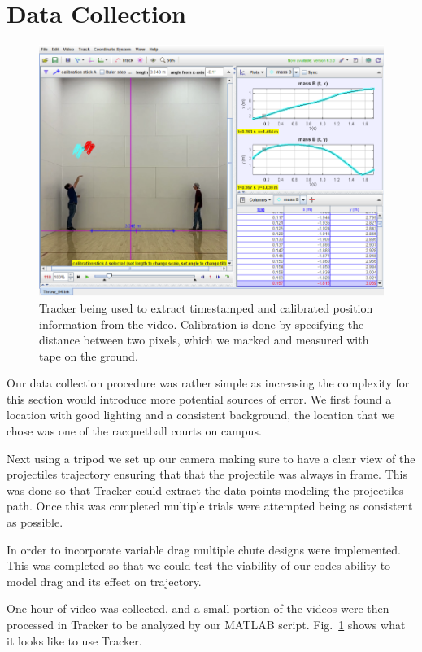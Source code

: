\section{Data Collection}

\begin{figure}[t]
\centering
\includegraphics[width=.9\linewidth]{images/TrackerScreenshot.png}
\caption{\label{fig:TrackerScreenshot} Tracker being used to extract timestamped and calibrated position information from the video. Calibration is done by specifying the distance between two pixels, which we marked and measured with tape on the ground.}
\end{figure}

	Our data collection procedure was rather simple as increasing the complexity for this section would introduce more potential sources of error. We first found a location with good lighting and a consistent background, the location that we chose was one of the racquetball courts on campus. 
	
	Next using a tripod we set up our camera making sure to have a clear view of the projectiles trajectory ensuring that that the projectile was always in frame. This was done so that Tracker could extract the data points modeling the projectiles path. Once this was completed multiple trials were attempted being as consistent as possible. 
	
	In order to incorporate variable drag multiple chute designs were implemented. This was completed so that we could test the viability of our codes ability to model drag and its effect on trajectory. 
	
	One hour of video was collected, and a small portion of the videos were then processed in Tracker to be analyzed by our MATLAB script. Fig.~\ref{fig:TrackerScreenshot} shows what it looks like to use Tracker.